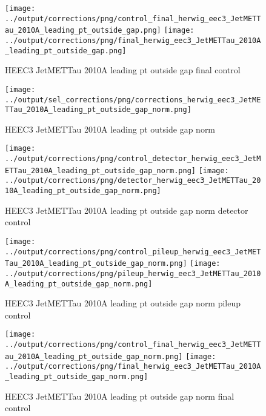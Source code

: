 \documentclass[11pt]{book}
\begin{document}
\begin{figure}[ht]
\centering
\texttt{[image: ../output/corrections/png/control\_final\_herwig\_eec3\_JetMETTau\_2010A\_leading\_pt\_outside\_gap.png]}
\texttt{[image: ../output/corrections/png/final\_herwig\_eec3\_JetMETTau\_2010A\_leading\_pt\_outside\_gap.png]}
\caption{HEEC3 JetMETTau 2010A leading pt outside gap final control}
\label{fig:HEEC3_JetMETTau_2010A_leading_pt_outside_gap_final_control}
\end{figure}



\begin{figure}[ht]
\centering
\texttt{[image: ../output/sel\_corrections/png/corrections\_herwig\_eec3\_JetMETTau\_2010A\_leading\_pt\_outside\_gap\_norm.png]}
\caption{HEEC3 JetMETTau 2010A leading pt outside gap norm}
\label{fig:HEEC3_JetMETTau_2010A_leading_pt_outside_gap_norm}
\end{figure}

\begin{figure}[ht]
\centering
\texttt{[image: ../output/corrections/png/control\_detector\_herwig\_eec3\_JetMETTau\_2010A\_leading\_pt\_outside\_gap\_norm.png]}
\texttt{[image: ../output/corrections/png/detector\_herwig\_eec3\_JetMETTau\_2010A\_leading\_pt\_outside\_gap\_norm.png]}
\caption{HEEC3 JetMETTau 2010A leading pt outside gap norm detector control}
\label{fig:HEEC3_JetMETTau_2010A_leading_pt_outside_gap_norm_detector_control}
\end{figure}

\begin{figure}[ht]
\centering
\texttt{[image: ../output/corrections/png/control\_pileup\_herwig\_eec3\_JetMETTau\_2010A\_leading\_pt\_outside\_gap\_norm.png]}
\texttt{[image: ../output/corrections/png/pileup\_herwig\_eec3\_JetMETTau\_2010A\_leading\_pt\_outside\_gap\_norm.png]}
\caption{HEEC3 JetMETTau 2010A leading pt outside gap norm pileup control}
\label{fig:HEEC3_JetMETTau_2010A_leading_pt_outside_gap_norm_pileup_control}
\end{figure}


\begin{figure}[ht]
\centering
\texttt{[image: ../output/corrections/png/control\_final\_herwig\_eec3\_JetMETTau\_2010A\_leading\_pt\_outside\_gap\_norm.png]}
\texttt{[image: ../output/corrections/png/final\_herwig\_eec3\_JetMETTau\_2010A\_leading\_pt\_outside\_gap\_norm.png]}
\caption{HEEC3 JetMETTau 2010A leading pt outside gap norm final control}
\label{fig:HEEC3_JetMETTau_2010A_leading_pt_outside_gap_norm_final_control}
\end{figure}
\end{document}
